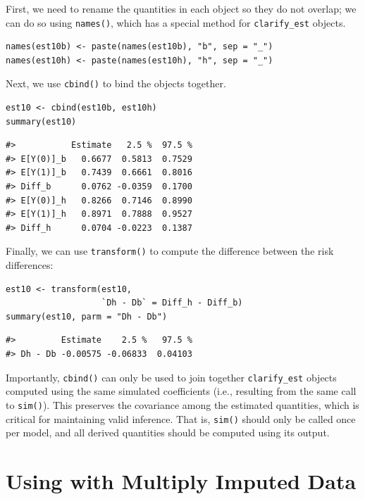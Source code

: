 First, we need to rename the quantities in each object so they do not overlap; we can do so using \texttt{names()}, which has a special method for \texttt{clarify\_est} objects.

\begin{verbatim}
names(est10b) <- paste(names(est10b), "b", sep = "_")
names(est10h) <- paste(names(est10h), "h", sep = "_")
\end{verbatim}

Next, we use \texttt{cbind()} to bind the objects together.

\begin{verbatim}
est10 <- cbind(est10b, est10h)
summary(est10)
\end{verbatim}

\begin{verbatim}
#>           Estimate   2.5 %  97.5 %
#> E[Y(0)]_b   0.6677  0.5813  0.7529
#> E[Y(1)]_b   0.7439  0.6661  0.8016
#> Diff_b      0.0762 -0.0359  0.1700
#> E[Y(0)]_h   0.8266  0.7146  0.8990
#> E[Y(1)]_h   0.8971  0.7888  0.9527
#> Diff_h      0.0704 -0.0223  0.1387
\end{verbatim}

Finally, we can use \texttt{transform()} to compute the difference between the risk differences:

\begin{verbatim}
est10 <- transform(est10,
                   `Dh - Db` = Diff_h - Diff_b)
summary(est10, parm = "Dh - Db")
\end{verbatim}

\begin{verbatim}
#>         Estimate    2.5 %   97.5 %
#> Dh - Db -0.00575 -0.06833  0.04103
\end{verbatim}

Importantly, \texttt{cbind()} can only be used to join together \texttt{clarify\_est} objects computed using the same simulated coefficients (i.e., resulting from the same call to \texttt{sim()}). This preserves the covariance among the estimated quantities, which is critical for maintaining valid inference. That is, \texttt{sim()} should only be called once per model, and all derived quantities should be computed using its output.

\section{\texorpdfstring{Using  with Multiply Imputed Data}{Using  with Multiply Imputed Data}}\label{using-with-multiply-imputed-data}

